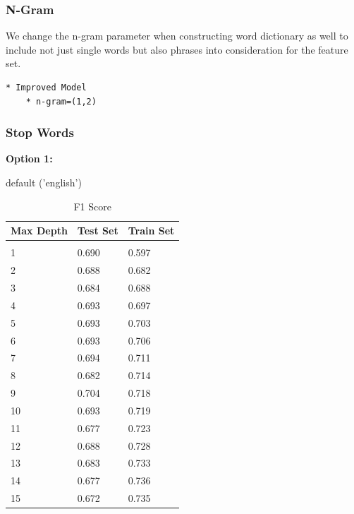 \documentclass{article} %
\begin{document}
\subsubsection{N-Gram}

We change the n-gram parameter when constructing word dictionary as well to include not just single words but also phrases into consideration for the feature set.

\lstset{language=Python}
\lstset{frame=lines}
\lstset{basicstyle=\footnotesize}
\begin{lstlisting}	
* Improved Model
	* n-gram=(1,2)
\end{lstlisting}

\subsubsection{Stop Words}

\textbf{Option 1:}

default ('english')

\begin{table}[H]
	\caption{F1 Score}
	\label{sample-table}
	\begin{center}
		\begin{tabular}{|l|l|l|}
			\multicolumn{1}{c}{\bf Max Depth}  
			&\multicolumn{1}{c}{\bf Test Set}
			&\multicolumn{1}{c}{\bf Train Set}
			\\ \hline & &  \\
			1        &0.690 &0.597	 \\
			2        &0.688	&0.682	  \\
			3        &0.684	&0.688	 \\
			4        &0.693	&0.697	 \\
			5        &0.693	&0.703 \\
			6        &0.693 &0.706   \\
			7        &0.694 &0.711   \\
			8        &0.682 &0.714   \\
			9        &0.704 &0.718    \\
			10       &0.693  &0.719    \\
			11       &0.677  &0.723   \\
			12       &0.688 &0.728  \\
			13       &0.683 &0.733  \\
			14       &0.677  &0.736  \\
			15       &0.672 &0.735  \\
			\hline
		\end{tabular}
	\end{center}
\end{table}
\end{document}
